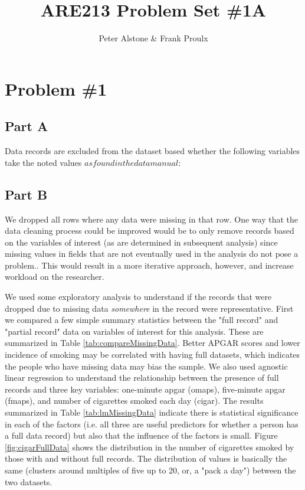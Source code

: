 \documentclass[a4paper, 12pt]{article}
\begin{document}
\title{ARE213 Problem Set \#1A}
\author{Peter Alstone \& Frank Proulx}
\maketitle

\section{Problem \#1}
\subsection{Part A}

Data records are excluded from the dataset based whether the following variables take the noted values \(as found in the data manual\):

\subsection{Part B}
We dropped all rows where any data were missing in that row.  One way that the data cleaning process could be improved would be to only remove records based on the variables of interest (as are determined in subsequent analysis) since missing values in fields that are not eventually used in the analysis do not pose a problem..  This would result in a more iterative approach, however, and increase workload on the researcher.

We used some exploratory analysis to understand if the records that were dropped due to missing data \textit{somewhere} in the record were representative.  First we compared a few simple summary statistics between the "full record" and "partial record" data on variables of interest for this analysis.  These are summarized in Table \ref{tab:compareMissingData}.  Better APGAR scores and lower incidence of smoking may be correlated with having full datasets, which indicates the people who have missing data may bias the sample.  We also used agnostic linear regression to understand the relationship between the presence of full records and three key variables: one-minute apgar (omaps), five-minute apgar (fmaps), and number of cigarettes smoked each day (cigar).  The results summarized in Table \ref{tab:lmMissingData} indicate there is statistical significance in each of the factors (i.e. all three are useful predictors for whether a person has a full data record) but also that the influence of the factors is small.  Figure \ref{fig:cigarFullData} shows the distribution in the number of cigarettes smoked by those with and without full records.  The distribution of values is basically the same (clusters around multiples of five up to 20, or, a "pack a day") between the two datasets.  
\end{document}
